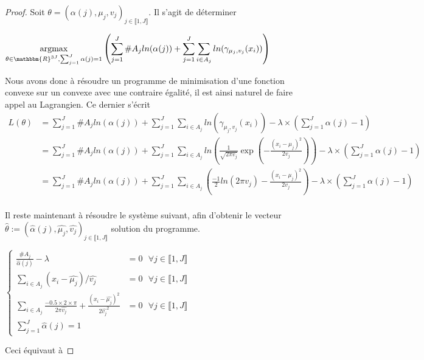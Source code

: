 \documentclass[frenchb]{report}
\newcommand{\R}{\mathbbm{R}}
\newcommand{\1}{\mathbbm{1}}
\theoremstyle{definition}\newtheorem{defn}{Définition}
\theoremstyle{definition}\newtheorem{exm}{Exemple}
\theoremstyle{definition}\newtheorem{nota}{Notation}
\theoremstyle{definition}\newtheorem{rem}{Remarque}
\begin{document}
\begin{proof}
Soit $\theta = (\alpha(j), \mu_j, v_j)_{j \in \llbracket 1,J \rrbracket}$. Il s'agit de déterminer 
\begin{center}
	$\underset{\theta\in\R^{3J}, \sum_{j=1}^J\alpha(j) = 1}{\text{argmax}}\left(\displaystyle\sum_{j=1}^J \#A_j ln(\alpha(j))+ \sum_{j=1}^J\sum_{i\in A_j} ln(\gamma_{\mu_j, v_j}(x_i))\right)$
\end{center}
Nous avons donc à résoudre un programme de minimisation d'une fonction convexe sur un convexe avec une contraire égalité, il est ainsi naturel de faire appel au Lagrangien. \newline 
Ce dernier s'écrit
\begin{align*} 
L(\theta) &= \displaystyle\sum_{j=1}^J \#A_j ln(\alpha(j))+ \sum_{j=1}^J\sum_{i\in A_j} ln(\gamma_{\mu_j, v_j}(x_i)) - \lambda\times\left(\sum_{j=1}^J\alpha(j) - 1\right)\\
&= \displaystyle\sum_{j=1}^J \#A_j ln(\alpha(j))+ \sum_{j=1}^J\sum_{i\in A_j} ln\left(\frac{1}{\sqrt{2\pi v_j}}\exp\left(-\frac{\left(x_i -\mu_j\right)^2}{2v_j} \right)\right) - \lambda\times\left(\sum_{j=1}^J\alpha(j) - 1\right)\\
&= \displaystyle\sum_{j=1}^J \#A_j ln(\alpha(j))+ \sum_{j=1}^J\sum_{i\in A_j}\left( \frac{-1}{2}ln(2\pi v_j) -\frac{(x_i-\mu_j)^2}{2v_j}\right) - \lambda\times\left(\sum_{j=1}^J\alpha(j) - 1\right)\\
\end{align*}

Il reste maintenant à résoudre le système suivant, afin d'obtenir le vecteur $\hat{\theta} := (\hat{\alpha}(j), \hat{\mu_j}, \hat{v_j})_{j\in\llbracket 1,J \rrbracket}$ solution du programme.

$
\begin{cases}
\displaystyle\frac{\#A_j}{\hat{\alpha}(j)} - \lambda &= 0 \text{ } \forall j \in \llbracket 1,J \rrbracket \\
\displaystyle\sum_{i\in A_j} (x_i-\hat{\mu_j})/\hat{v_j} & = 0 \text{ } \forall j \in \llbracket 1,J \rrbracket \\
\displaystyle\sum_{i\in A_j} \frac{-0.5 \times 2 \times \pi}{2\pi \hat{v_j}} +\frac{(x_i-\hat{\mu_j})^2}{2\hat{v_j}^2} &= 0 \text{ } \forall j \in \llbracket 1,J \rrbracket\\
\displaystyle\sum_{j=1}^J \hat{\alpha}(j) = 1
\end{cases}
$

Ceci équivaut à 


\end{proof}
\end{document}
